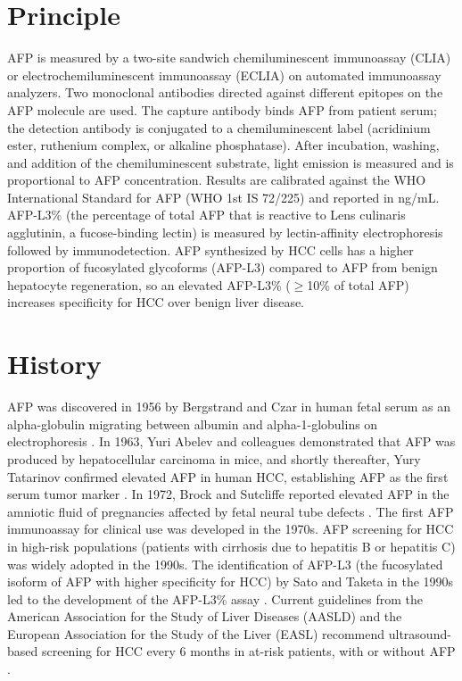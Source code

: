 \section*{Principle}
AFP is measured by a two-site sandwich chemiluminescent immunoassay (CLIA) or electrochemiluminescent immunoassay (ECLIA) on automated immunoassay analyzers. Two monoclonal antibodies directed against different epitopes on the AFP molecule are used. The capture antibody binds AFP from patient serum; the detection antibody is conjugated to a chemiluminescent label (acridinium ester, ruthenium complex, or alkaline phosphatase). After incubation, washing, and addition of the chemiluminescent substrate, light emission is measured and is proportional to AFP concentration. Results are calibrated against the WHO International Standard for AFP (WHO 1st IS 72/225) and reported in ng/mL. AFP-L3\% (the percentage of total AFP that is reactive to Lens culinaris agglutinin, a fucose-binding lectin) is measured by lectin-affinity electrophoresis followed by immunodetection. AFP synthesized by HCC cells has a higher proportion of fucosylated glycoforms (AFP-L3) compared to AFP from benign hepatocyte regeneration, so an elevated AFP-L3\% ($\geq$10\% of total AFP) increases specificity for HCC over benign liver disease.

\section*{History}
AFP was discovered in 1956 by Bergstrand and Czar in human fetal serum as an alpha-globulin migrating between albumin and alpha-1-globulins on electrophoresis \cite{bergstrand1956demonstration}. In 1963, Yuri Abelev and colleagues demonstrated that AFP was produced by hepatocellular carcinoma in mice, and shortly thereafter, Yury Tatarinov confirmed elevated AFP in human HCC, establishing AFP as the first serum tumor marker \cite{abelev1963production}. In 1972, Brock and Sutcliffe reported elevated AFP in the amniotic fluid of pregnancies affected by fetal neural tube defects \cite{brock1972alpha}. The first AFP immunoassay for clinical use was developed in the 1970s. AFP screening for HCC in high-risk populations (patients with cirrhosis due to hepatitis B or hepatitis C) was widely adopted in the 1990s. The identification of AFP-L3 (the fucosylated isoform of AFP with higher specificity for HCC) by Sato and Taketa in the 1990s led to the development of the AFP-L3\% assay \cite{li2001afpl3}. Current guidelines from the American Association for the Study of Liver Diseases (AASLD) and the European Association for the Study of the Liver (EASL) recommend ultrasound-based screening for HCC every 6 months in at-risk patients, with or without AFP \cite{marrero2018diagnosis}.

